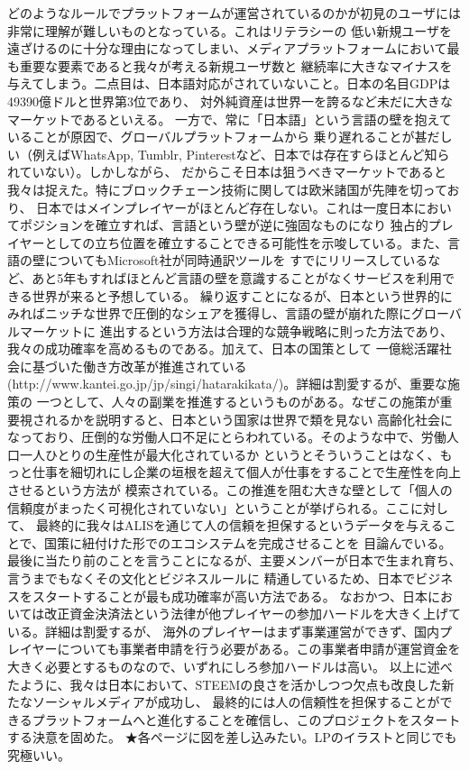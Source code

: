 \documentclass{jsarticle}
\begin{document}
どのようなルールでプラットフォームが運営されているのかが初見のユーザには非常に理解が難しいものとなっている。これはリテラシーの
低い新規ユーザを遠ざけるのに十分な理由になってしまい、メディアプラットフォームにおいて最も重要な要素であると我々が考える新規ユーザ数と
継続率に大きなマイナスを与えてしまう。二点目は、日本語対応がされていないこと。日本の名目GDPは49390億ドルと世界第3位であり、
対外純資産は世界一を誇るなど未だに大きなマーケットであるといえる。
一方で、常に「日本語」という言語の壁を抱えていることが原因で、グローバルプラットフォームから
乗り遅れることが甚だしい（例えばWhatsApp, Tumblr, Pinterestなど、日本では存在すらほとんど知られていない）。しかしながら、
だからこそ日本は狙うべきマーケットであると我々は捉えた。特にブロックチェーン技術に関しては欧米諸国が先陣を切っており、
日本ではメインプレイヤーがほとんど存在しない。これは一度日本においてポジションを確立すれば、言語という壁が逆に強固なものになり
独占的プレイヤーとしての立ち位置を確立することできる可能性を示唆している。また、言語の壁についてもMicrosoft社が同時通訳ツールを
すでにリリースしているなど、あと5年もすればほとんど言語の壁を意識することがなくサービスを利用できる世界が来ると予想している。
繰り返すことになるが、日本という世界的にみればニッチな世界で圧倒的なシェアを獲得し、言語の壁が崩れた際にグローバルマーケットに
進出するという方法は合理的な競争戦略に則った方法であり、我々の成功確率を高めるものである。加えて、日本の国策として
一億総活躍社会に基づいた働き方改革が推進されている(http://www.kantei.go.jp/jp/singi/hatarakikata/)。詳細は割愛するが、重要な施策の
一つとして、人々の副業を推進するというものがある。なぜこの施策が重要視されるかを説明すると、日本という国家は世界で類を見ない
高齢化社会になっており、圧倒的な労働人口不足にとらわれている。そのような中で、労働人口一人ひとりの生産性が最大化されているか
というとそういうことはなく、もっと仕事を細切れにし企業の垣根を超えて個人が仕事をすることで生産性を向上させるという方法が
模索されている。この推進を阻む大きな壁として「個人の信頼度がまったく可視化されていない」ということが挙げられる。ここに対して、
最終的に我々はALISを通じて人の信頼を担保するというデータを与えることで、国策に紐付けた形でのエコシステムを完成させることを
目論んでいる。最後に当たり前のことを言うことになるが、主要メンバーが日本で生まれ育ち、言うまでもなくその文化とビジネスルールに
精通しているため、日本でビジネスをスタートすることが最も成功確率が高い方法である。
なおかつ、日本においては改正資金決済法という法律が他プレイヤーの参加ハードルを大きく上げている。詳細は割愛するが、
海外のプレイヤーはまず事業運営ができず、国内プレイヤーについても事業者申請を行う必要がある。この事業者申請が運営資金を
大きく必要とするものなので、いずれにしろ参加ハードルは高い。
以上に述べたように、我々は日本において、STEEMの良さを活かしつつ欠点も改良した新たなソーシャルメディアが成功し、
最終的には人の信頼性を担保することができるプラットフォームへと進化することを確信し、このプロジェクトをスタートする決意を固めた。
★各ページに図を差し込みたい。LPのイラストと同じでも究極いい。
\end{document}
